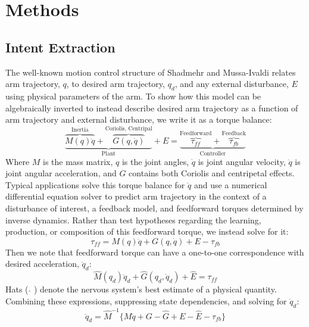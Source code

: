 \documentclass[letterpaper, 10 pt, conference]{ieeeconf}  %
\begin{document}
\section{Methods}

\subsection{Intent Extraction}
The well-known motion control structure of Shadmehr and Mussa-Ivaldi\cite{shadmehr1994adaptive} relates arm trajectory, $q$, to desired arm trajectory, $q_d$, and any external disturbance, $E$ using physical parameters of the arm. To show how this model can be algebraically inverted to instead describe desired arm trajectory as a function of arm trajectory and external disturbance, we write it as a torque balance:
\begin{equation}
\underbrace{\overbrace{M(q)\ddot{q}}^{\text{Inertia}}+\overbrace{G(q,\dot{q})}^{\text{Coriolis, Centripal}}}_{\text{Plant}}+E=
\underbrace{\overbrace{\tau_{ff}}^{\text{Feedforward}}+\overbrace{\tau_{fb}}^{\text{Feedback}}}_\text{Controller}
\end{equation}
Where $M$ is the mass matrix, $q$ is the joint angles, $\dot{q}$ is joint angular velocity, $\ddot{q}$ is joint angular acceleration, and $G$ contains both Coriolis and centripetal effects. Typical applications solve this torque balance for $\ddot{q}$ and use a numerical differential equation solver to predict arm trajectory in the context of a disturbance of interest, a feedback model, and feedforward torques determined by inverse dynamics. Rather than test hypotheses regarding the learning, production, or composition of this feedforward torque, we instead solve for it:
\begin{equation}
\tau_{ff}=M(q)\ddot{q}+G(q,\dot{q})+E-\tau_{fb}
\end{equation}
Then we note that feedforward torque can have a one-to-one correspondence with desired acceleration, $\ddot{q}_d$:
\begin{equation}
\hat{M}(q_d)\ddot{q}_d+\hat{G}(q_d,\dot{q}_d)+\hat{E}=\tau_{ff}
\end{equation}
Hats ( $\hat{}$ ) denote the nervous system's best estimate of a physical quantity. Combining these expressions, suppressing state dependencies, and solving for $\ddot{q}_d$:
\begin{equation}
\ddot{q}_d=\hat{M}^{-1} \{M\ddot{q}+G-\hat{G}+E-\hat{E}-\tau_{fb}\}
\end{equation}
\end{document}
